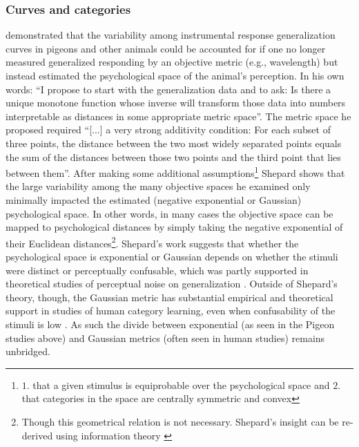 \subsubsection{Curves and categories}
\label{subsub:curves}
 demonstrated that the variability among instrumental response generalization curves in pigeons and other animals could be accounted for if one no longer measured generalized responding by an objective metric (e.g., wavelength) but instead estimated the psychological space of the animal's perception.  In his own words: ``I propose to start with the generalization data and to ask: Is there a unique monotone function whose inverse will transform those data into numbers interpretable as distances in some appropriate metric space''. The metric space he proposed required ``[...] a very strong additivity condition: For each subset of three points, the distance between the two most widely separated points equals the sum of the distances between those two points and the third point that lies between them''.  After making some additional assumptions\footnote{
    $1.$ that a given stimulus is equiprobable over the psychological space and $2.$ that categories in the space are centrally symmetric and convex
} Shepard shows that the large variability among the many objective spaces he examined only minimally impacted the estimated (negative exponential or Gaussian) psychological space.  In other words, in many cases the objective space can be mapped to psychological distances by simply taking the negative exponential of their Euclidean distances\footnote{
    Though this geometrical relation is not necessary.  Shepard's insight can be re-derived using information theory \cite{Chatera:2003p9103}}.  
    Shepard's work suggests that whether the psychological space is exponential or Gaussian depends on whether the stimuli were distinct or perceptually confusable, which was partly supported in theoretical studies of perceptual noise on generalization \cite{Ennis:1988p9359}.  Outside of Shepard's theory, though, the Gaussian metric has substantial empirical and theoretical support in studies of human category learning, even when confusability of the stimuli is low \cite{Nosofsky:1985p9356,Medin:2012p9358}.  As such the divide between exponential (as seen in the Pigeon studies above) and Gaussian metrics (often seen in human studies) remains unbridged.

